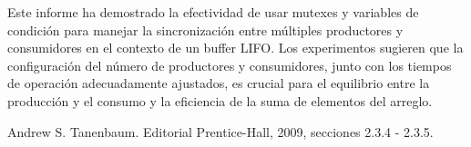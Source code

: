 \documentclass[a4paper,twocolumn]{article}
\begin{document}
Este informe ha demostrado la efectividad de usar mutexes y variables de condición para manejar la sincronización entre múltiples productores y consumidores en el contexto de un buffer LIFO. Los experimentos sugieren que la configuración del número de productores y consumidores, junto con los tiempos de operación adecuadamente ajustados, es crucial para el equilibrio entre la producción y el consumo y la eficiencia de la suma de elementos del arreglo.

	
\begin{thebibliography}{99} %
		
    Andrew S. Tanenbaum. 
	\newblock Editorial Prentice-Hall, 2009, secciones 2.3.4 - 2.3.5.
		
\end{thebibliography}
	
	
\end{document}
